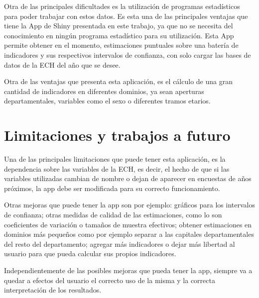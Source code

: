 \documentclass[12pt,twoside,spanish,a4paper]{book}\usepackage[]{graphicx}\usepackage[]{color}
\begin{document}
Otra de las principales dificultades es la utilización de programas estadísticos para poder trabajar con estos datos. Es esta una de las principales ventajas que tiene la App de Shiny presentada en este trabajo, ya que no se necesita del conocimiento en ningún programa estadístico para su utilización. Esta App permite obtener en el momento, estimaciones puntuales sobre una batería de indicadores y sus respectivos intervalos de confianza, con solo cargar las bases de datos de la ECH del año que se desee. 

Otra de las ventajas que presenta esta aplicación, es el cálculo de una gran cantidad de indicadores en diferentes dominios, ya sean aperturas departamentales, variables como el sexo o diferentes tramos etarios.


\section{Limitaciones y trabajos a futuro \label{sec:lim}}

Una de las principales limitaciones que puede tener esta aplicación, es la dependencia sobre las variables de la ECH, es decir, el hecho de que si las variables utilizadas cambian de nombre o dejan de aparecer en encuestas de años próximos, la app debe ser modificada para su correcto funcionamiento.

Otras mejoras que puede tener la app son por ejemplo: gráficos para los intervalos de confianza; otras medidas de calidad de las estimaciones, como lo son coeficientes de variación o tamaños de muestra efectivos; obtener estimaciones en dominios más pequeños como por ejemplo separar a las capitales departamentales del resto del departamento; agregar más indicadores o dejar más libertad al usuario para que pueda calcular sus propios indicadores.

Independientemente de las posibles mejoras que pueda tener la app, siempre va a quedar a efectos del usuario el correcto uso de la misma y la correcta interpretación de los resultados.






\end{document}
